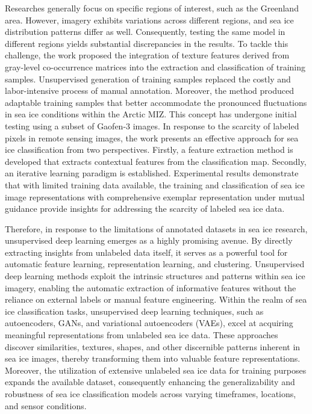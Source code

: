 Researches generally focus on specific regions of interest, such as the Greenland area. However, imagery exhibits variations across different regions, and sea ice distribution patterns differ as well. Consequently, testing the same model in different regions yields substantial discrepancies in the results. To tackle this challenge, the work \cite{68li2020extraction} proposed the integration of texture features derived from gray-level co-occurrence matrices into the extraction and classification of training samples. Unsupervised generation of training samples replaced the costly and labor-intensive process of manual annotation. Moreover, the method produced adaptable training samples that better accommodate the pronounced fluctuations in sea ice conditions within the Arctic MIZ. This concept has undergone initial testing using a subset of Gaofen-3 images. In response to the scarcity of labeled pixels in remote sensing images, the work \cite{19710106038} presents an effective approach for sea ice classification from two perspectives. Firstly, a feature extraction method is developed that extracts contextual features from the classification map. Secondly, an iterative learning paradigm is established. Experimental results demonstrate that with limited training data available, the training and classification of sea ice image representations with comprehensive exemplar representation under mutual guidance provide insights for addressing the scarcity of labeled sea ice data.

Therefore, in response to the limitations of annotated datasets in sea ice research, unsupervised deep learning emerges as a highly promising avenue. By directly extracting insights from unlabeled data itself, it serves as a powerful tool for automatic feature learning, representation learning, and clustering. Unsupervised deep learning methods exploit the intrinsic structures and patterns within sea ice imagery, enabling the automatic extraction of informative features without the reliance on external labels or manual feature engineering. Within the realm of sea ice classification tasks, unsupervised deep learning techniques, such as autoencoders, GANs, and variational autoencoders (VAEs), excel at acquiring meaningful representations from unlabeled sea ice data. These approaches discover similarities, textures, shapes, and other discernible patterns inherent in sea ice images, thereby transforming them into valuable feature representations. Moreover, the utilization of extensive unlabeled sea ice data for training purposes expands the available dataset, consequently enhancing the generalizability and robustness of sea ice classification models across varying timeframes, locations, and sensor conditions.

